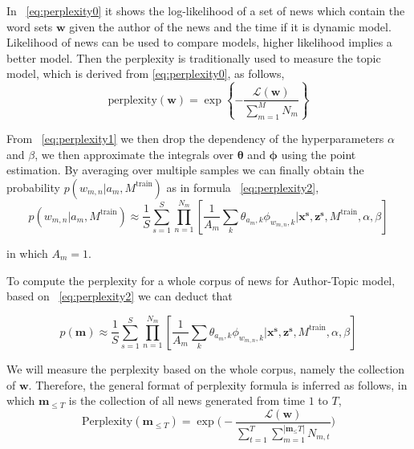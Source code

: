 { In ~\ref{eq:perplexity0} it shows the log-likelihood of a set of news which contain the word sets $\boldsymbol{w}$ given the author of the news and the time if it is dynamic model. Likelihood of news can be used to compare models, higher likelihood implies a better model. Then the perplexity is traditionally used to measure the topic model, which is derived from \ref{eq:perplexity0}, as follows,
 \begin{equation}\label{eq:perplexity1}
 \text{perplexity}(\boldsymbol w) =
        \exp \left\{
        - \frac{\mathcal L(\boldsymbol w)}{\sum_{m=1}^M{N_m}}
        \right\}
\end{equation}
 

From ~\ref{eq:perplexity1} we then drop the dependency of the hyperparameters $\alpha$ and $\beta$, we then approximate the integrals over $\boldsymbol{\theta}$ and $\boldsymbol{\phi}$ using the point estimation. By averaging over multiple samples we can finally obtain the probability $p(w_{m,n}|a_m,M^\text{train})$ as in formula ~\ref{eq:perplexity2},
\begin{equation}\label{eq:perplexity2}
p(w_{m,n}|a_m,M^\text{train}) \approx \frac{1}{S} \sum_{s=1}^{S}\prod_{n=1}^{N_m}[\frac{1}{A_m}\sum_{k}\theta_{a_m,k}\phi_{w_{m,n},k}|\boldsymbol{x^s},\boldsymbol{z^s},M^\text{train},\alpha,\beta]
\end{equation}

in which $A_m = 1$. 

To compute the perplexity for a whole corpus of news for Author-Topic model, based on ~\ref{eq:perplexity2} we can deduct that 

\begin{equation}\label{eq:perplexity2}
p(\boldsymbol{m}) \approx \frac{1}{S} \sum_{s=1}^{S}\prod_{n=1}^{N_m}[\frac{1}{A_m}\sum_{k}\theta_{a_m,k}\phi_{w_{m,n},k}|\boldsymbol{x^s},\boldsymbol{z^s},M^\text{train},\alpha,\beta]
\end{equation}

We will measure the perplexity based on the whole corpus, namely the collection of $\boldsymbol{w}$. Therefore, the general format of perplexity formula is inferred as follows, in which $\mathbf{m}_{\le T}$ is the collection of all news generated from time $1$ to $T$, 
\begin{equation}
\text{Perplexity}(\mathbf{m}_{\le T})=\exp\big(-\frac{ \mathcal L (\boldsymbol w)}{\sum_{t=1}^{T}\sum_{m=1}^{|\mathbf{m}_\le T|} N_{m,t}}\big)
\end{equation}

}
